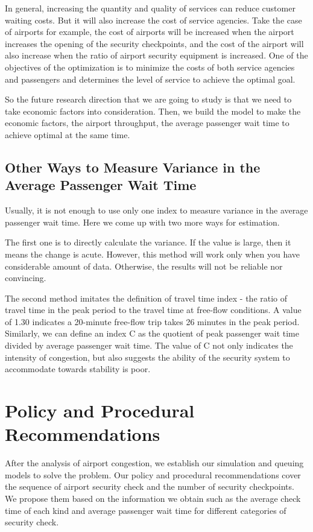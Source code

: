 \documentclass{mcmthesis}
\begin{document}
\par In general, increasing the quantity and quality of services can reduce customer waiting costs. But it will also increase the cost of service agencies. Take the case of airports for example, the cost of airports will be increased when the airport increases the opening of the security checkpoints, and the cost of the airport will also increase when the ratio of airport security equipment is increased. One of the objectives of the optimization is to minimize the costs of both service agencies and passengers and determines the level of service to achieve the optimal goal.
\par So the future research direction that we are going to study is that we need to take   economic factors into consideration. Then, we build the model to make the economic factors, the airport throughput, the average passenger wait time to achieve optimal at the same time.

\subsection*{Other Ways to Measure Variance in the Average Passenger Wait Time}
\par Usually, it is not enough to use only one index to measure variance in the average passenger wait time. Here we come up with two more ways for estimation.
\par The first one is to directly calculate the variance. If the value is large, then it means the change is acute. However, this method will work only when you have considerable amount of data. Otherwise, the results will not be reliable nor convincing.
\par The second method imitates the definition of travel time index - the ratio of travel time in the peak period to the travel time at free-flow conditions. A value of 1.30 indicates a 20-minute free-flow trip takes 26 minutes in the peak period. Similarly, we can define an index C as the quotient of peak passenger wait time divided by average passenger wait time. The value of C not only indicates the intensity of congestion, but also suggests the ability of the security system to accommodate towards stability is poor.
\section{Policy and Procedural Recommendations}

\par After the analysis of airport congestion, we establish our simulation and queuing models to solve the problem.  Our policy and procedural recommendations cover the sequence of airport security check and the number of security checkpoints. We propose them based on the information we obtain such as the average check time of each kind and average passenger wait time for different categories of security check.
\end{document}
